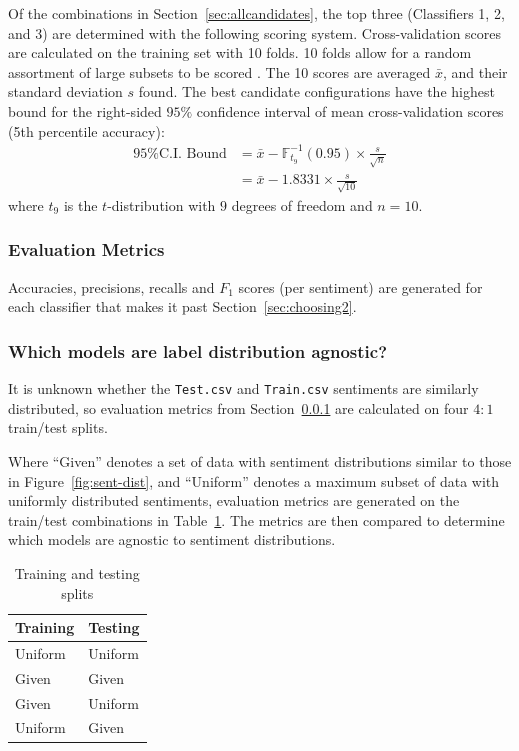 \documentclass[11pt]{article}
\begin{document}
Of the combinations in Section~\ref{sec:allcandidates}, 
the top three (Classifiers 1, 2, and 3) are determined with the following scoring system.
Cross-validation scores are calculated on the training set with 10 folds.
10 folds allow for a random assortment of large subsets to be scored .
The 10 scores are averaged $\bar{x}$, and their standard deviation $s$ found. 
The best candidate configurations have the highest bound for the right-sided $95\%$ confidence interval of mean cross-validation scores (5th percentile accuracy):
\begin{align*}
	\text{95\% C.I. Bound} &= \bar{x} - \mathbb{F}_{t_9}^{-1}(0.95) \times \frac{s}{\sqrt{n}} \\
	&= \bar{x} - 1.8331 \times \frac{s}{\sqrt{10}}
\end{align*}
where $t_9$ is the $t$-distribution with $9$ degrees of freedom and $n = 10$.

\subsubsection{Evaluation Metrics}\label{sec:evalmetrics}

Accuracies, precisions, recalls and $F_1$ scores (per sentiment) are generated for each classifier that makes it past Section~\ref{sec:choosing2}.

\subsubsection{Which models are label distribution agnostic?}

It is unknown whether the \texttt{Test.csv} and \texttt{Train.csv} sentiments are similarly distributed, 
so evaluation metrics from Section~\ref{sec:evalmetrics} are calculated on four $4:1$ train/test splits.

Where ``Given'' denotes a set of data with sentiment distributions similar to those in Figure~\ref{fig:sent-dist},
and ``Uniform'' denotes a maximum subset of data with uniformly distributed sentiments,
evaluation metrics are generated on the train/test combinations in Table~\ref{tbl:train-test}.
The metrics are then compared to determine which models are agnostic to sentiment distributions.

\begin{table}[H]
	\begin{center}
		\begin{tabular}{|l|l|}			
			\hline
			Training & Testing \\
			\hline
			Uniform & Uniform \\
			Given & Given \\
			Given & Uniform \\
			Uniform & Given \\
			\hline
		\end{tabular}
		\caption{Training and testing splits}
		\label{tbl:train-test}
	\end{center}
\end{table}
\end{document}
